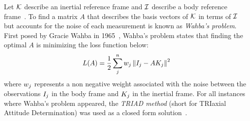 Let $\mathcal{K}$ describe an inertial reference frame and $\mathcal{I}$ describe a body reference
frame~\cite{wie:spaceVehicleDynamics}.
To find a matrix $A$ that describes the basis vectors of $\mathcal{K}$ in terms of $\mathcal{I}$ but accounts
for the noise of each measurement is known as \textit{Wahba's problem}.
First posed by Gracie Wahba in 1965~\cite{wahba:attitudeEstimationProblem},
Wahba's problem states that finding the optimal $A$ is minimizing the loss function below:
\begin{equation}
    L(A) = \frac{1}{2} \sum_j^n w_j \left\| I_j - AK_j \right\|^2
\end{equation}
where $w_j$ represents a non negative weight associated with the noise between the observations $I_j$
in the body frame and $K_j$ in the inertial frame.
For all instances where Wahba's problem appeared, the \textit{TRIAD method} (short for TRIaxial Attitude Determination)
was used as a closed form solution~\cite{markley:attitudeDeterminationTwoVectors}.

%

